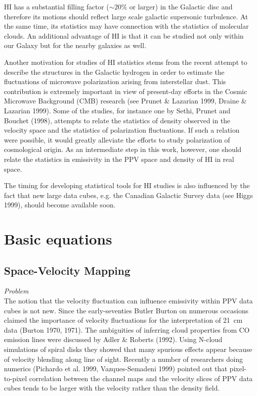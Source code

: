 HI has a substantial filling factor ($\sim 20\%$ or larger) in the Galactic
disc and therefore its motions should reflect large scale galactic
supersonic turbulence. At the same time, its statistics 
may have connection with the statistics of molecular clouds. An
additional advantage of HI is that it can be studied not
only within our Galaxy but for the nearby galaxies as well.


Another motivation for studies of HI statistics stems from the recent attempt
to describe the structures in the Galactic hydrogen in order
to estimate the fluctuations of microwave polarization arising from
interstellar dust. This contribution is extremely important in view of
present-day efforts in the Cosmic Microwave Background (CMB)
 research (see Prunet \& Lazarian 1999,
Draine \& Lazarian 1999). Some of the studies, for instance 
one by Sethi, Prunet and Bouchet (1998),
attempts to relate the statistics of density observed in the velocity
space and the statistics of polarization fluctuations. If such a
relation were possible, it would greatly alleviate the efforts to study
polarization of cosmological origin. As an intermediate step in this work,
however, one should relate the statistics in emissivity in the PPV
space and density of HI in real space.
 
The timing for developing statistical tools for HI studies
is also influenced by the fact that new large data cubes, e.g.
the Canadian Galactic Survey data (see Higgs 1999), 
should become available soon.

\section{Basic equations}

\subsection{Space-Velocity Mapping}

{\em Problem}\\
The notion that the velocity fluctuation can influence emissivity
within PPV data cubes is not new.
Since the early-seventies 
Butler Burton on numerous occasions claimed the importance of
velocity fluctuations for the interpretation of 21~cm data (Burton 1970,
1971). The
ambiguities of inferring cloud properties from CO emission lines
were discussed by Adler \& Roberts (1992). Using N-cloud
simulations of spiral disks they showed that many spurious
effects appear because of velocity blending along line of sight.
Recently a number of researchers
doing numerics (Pichardo et al. 1999, Vazques-Semadeni 1999) pointed out
that pixel-to-pixel correlation between the channel maps and 
the velocity slices of PPV data cubes tends to be larger with the
velocity rather than the  density field.


